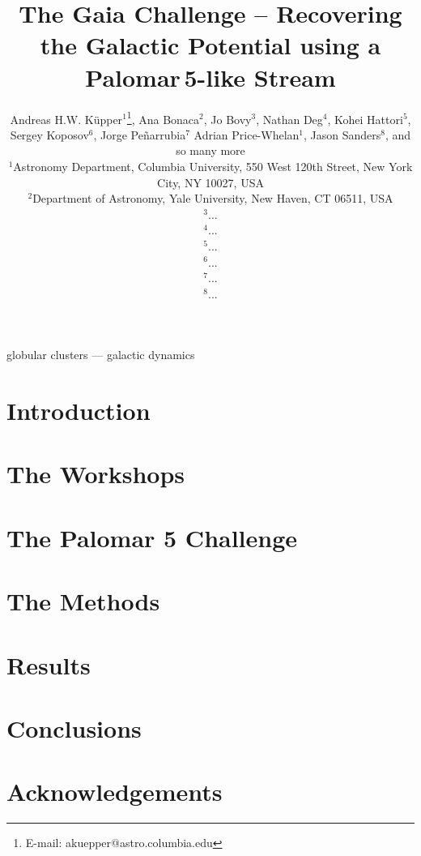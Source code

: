 \documentclass[useAMS,usenatbib]{mn2e}
\title[Gaia Challenge -- Palomar\,5]{The Gaia Challenge -- Recovering the Galactic Potential using a Palomar\,5-like Stream}
\author[K\"upper et al.]
{Andreas H.W. K\"{u}pper$^{1}$\thanks{
E-mail: \mbox{akuepper@astro.columbia.edu}}, Ana Bonaca$^{2}$, Jo Bovy$^{3}$, Nathan Deg$^{4}$, Kohei Hattori$^{5}$, \newauthor
Sergey Koposov$^{6}$, Jorge Pe\~narrubia$^{7}$ Adrian Price-Whelan$^{1}$, Jason Sanders$^{8}$,\newauthor
and so many more\\
$^{1}$Astronomy Department, Columbia University, 550 West 120th Street, New York City, NY 10027, USA\\
$^{2}$Department of Astronomy, Yale University, New Haven, CT 06511, USA\\
$^{3}$...\\
$^{4}$...\\
$^{5}$...\\
$^{6}$...\\
$^{7}$...\\
$^{8}$...\\
}
\begin{document}


\maketitle

\label{firstpage}

\begin{abstract}

\end{abstract}




\begin{keywords}
globular clusters --- galactic dynamics
\end{keywords}





\section{Introduction}\label{sec:introduction}



\section{The Workshops}\label{sec:workshops}



\section{The Palomar 5 Challenge}\label{sec:challenge}



\section{The Methods}\label{sec:methods}



\section{Results}\label{sec:results}



\section{Conclusions}\label{sec:conclusions}



\section*{Acknowledgements}


\begin{thebibliography}{99}

\end{thebibliography}



\bsp \label{lastpage} 
\end{document}
